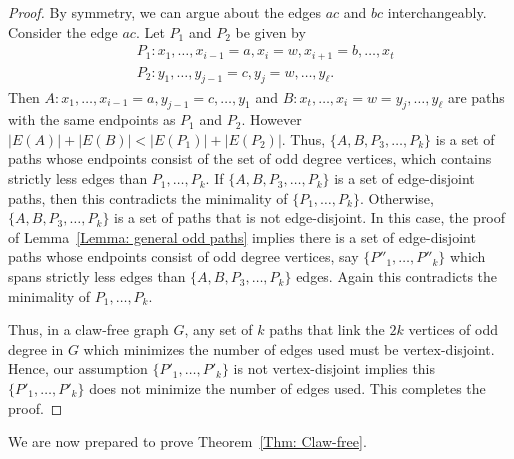 \documentclass[11pt]{amsart}
\theoremstyle{definition}
\begin{document}
\begin{proof}
    By symmetry, we can argue about the edges $ac$ and $bc$ interchangeably.
    Consider the edge $ac$.
    Let $P_1$ and $P_2$ be given by
\begin{align*}
    &P_1: x_1,\dots, x_{i-1} = a, x_i = w,x_{i+1} = b, \dots, x_t \\
    &P_2: y_1,\dots, y_{j-1} = c, y_j = w, \dots, y_\ell.
\end{align*}
    Then $A: x_1,\dots, x_{i-1} = a, y_{j-1} = c, \dots, y_1$ and $B: x_t,\dots, x_{i} = w = y_{j}, \dots, y_\ell$ are paths with the same endpoints as $P_1$ and $P_2$.
    However $|E(A)|+|E(B)|<|E(P_1)|+|E(P_2)|$.
    Thus, $\{A,B,P_3,\dots, P_k\}$ is a set of paths whose endpoints consist of the set of odd degree vertices, which contains strictly less edges than $P_1,\dots, P_k$.
    If $\{A,B,P_3,\dots, P_k\}$ is a set of edge-disjoint paths, then this contradicts the minimality of $\{P_1,\dots, P_k\}$.
    Otherwise, $\{A,B,P_3,\dots, P_k\}$ is a set of paths that is not edge-disjoint.
    In this case, the proof of Lemma~\ref{Lemma: general odd paths} implies there is a set of edge-disjoint paths whose endpoints consist of odd degree vertices, say $\{P''_1,\dots, P''_k\}$ which spans strictly less edges than $\{A,B,P_3,\dots, P_k\}$ edges.
    Again this contradicts the minimality of $P_1,\dots, P_k$.
    
Thus, in a claw-free graph $G$, any set of $k$ paths that link the $2k$ vertices of odd degree in $G$ which minimizes the number of edges used
must be vertex-disjoint.
Hence, our assumption $\{P'_1,\dots, P'_k\}$ is not vertex-disjoint implies this $\{P'_1,\dots, P'_k\}$ does not minimize the number of edges used.
This completes the proof.
\end{proof}

We are now prepared to prove Theorem~\ref{Thm: Claw-free}.
\end{document}
